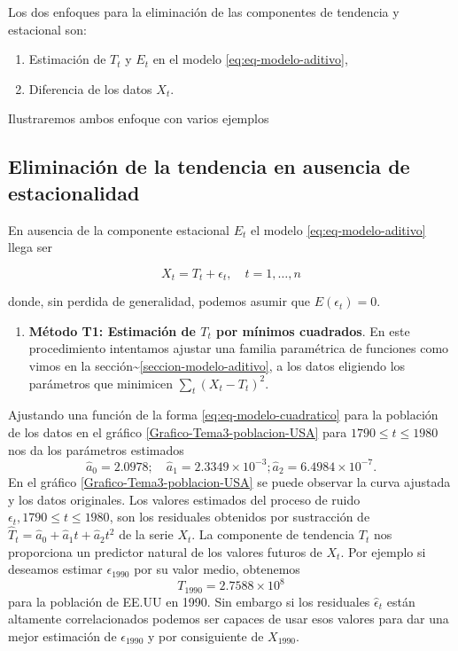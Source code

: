 \documentclass[12pt,]{krantz}
\providecommand{\tightlist}{%
  \setlength{\itemsep}{0pt}\setlength{\parskip}{0pt}}
\theoremstyle{definition}
\theoremstyle{definition}
\theoremstyle{definition}
\theoremstyle{remark}
\let\BeginKnitrBlock\begin \let\EndKnitrBlock\end
\begin{document}
Los dos enfoques para la eliminación de las componentes de tendencia y
estacional son:

\begin{enumerate}
\def\labelenumi{\arabic{enumi}.}
\tightlist
\item
  Estimación de \(T_t\) y \(E_t\) en el modelo
  \eqref{eq:eq-modelo-aditivo},
\item
  Diferencia de los datos \(X_t\).
\end{enumerate}

Ilustraremos ambos enfoque con varios ejemplos

\subsection{Eliminación de la tendencia en ausencia de
estacionalidad}\label{eliminacion-de-la-tendencia-en-ausencia-de-estacionalidad}

En ausencia de la componente estacional \(E_t\) el modelo
\eqref{eq:eq-modelo-aditivo} llega ser

\begin{equation}
X_t = T_t + \epsilon_t,\quad t=1,\ldots,n
\label{eq:eq-modelo-tendencia}
\end{equation}

donde, sin perdida de generalidad, podemos asumir que
\(E(\epsilon_t)=0\).

\begin{enumerate}
\def\labelenumi{\arabic{enumi}.}
\tightlist
\item
  \textbf{Método T1: Estimación de \(T_t\) por mínimos cuadrados}. En
  este procedimiento intentamos ajustar una familia paramétrica de
  funciones como vimos en la
  sección\textasciitilde{}\ref{seccion-modelo-aditivo}, a los datos
  eligiendo los parámetros que minimicen \(\sum_t(X_t-T_t)^2\).
\end{enumerate}

\BeginKnitrBlock{example}
\protect\hypertarget{exm:ejem-metodo-T1}{}{\label{exm:ejem-metodo-T1}
}Ajustando una función de la forma \eqref{eq:eq-modelo-cuadratico} para la
población de los datos en el gráfico \ref{Grafico-Tema3-poblacion-USA}
para \(1790\leq t\leq1980\) nos da los parámetros estimados
\[\hat{a}_0=2.0978;\quad \hat{a}_1=2.3349\times10^{-3}; \hat{a}_2=6.4984\times10^{-7}.\]
En el gráfico \ref{Grafico-Tema3-poblacion-USA} se puede observar la
curva ajustada y los datos originales. Los valores estimados del proceso
de ruido \(\epsilon_t, 1790\leq t\leq1980\), son los residuales
obtenidos por sustracción de
\(\hat{T}_t=\hat{a}_0+\hat{a}_1t+\hat{a}_2t^2\) de la serie \(X_t\). La
componente de tendencia \(T_t\) nos proporciona un predictor natural de
los valores futuros de \(X_t\). Por ejemplo si deseamos estimar
\(\epsilon_{1990}\) por su valor medio, obtenemos
\[T_{1990} = 2.7588\times10^8\] para la población de EE.UU en 1990. Sin
embargo si los residuales \(\hat{\epsilon}_t\) están altamente
correlacionados podemos ser capaces de usar esos valores para dar una
mejor estimación de \(\epsilon_{1990}\) y por consiguiente de
\(X_{1990}\).
\EndKnitrBlock{example}
\end{document}
